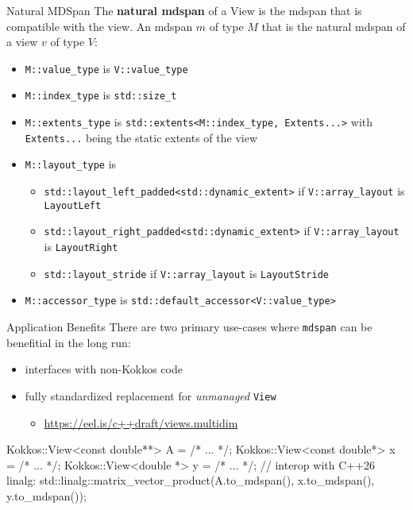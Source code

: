 \begin{frame}[fragile]{Natural MDSpan}
The \textbf{natural mdspan} of a View is the mdspan that is compatible with the view. An mdspan $m$ of type $M$ that is the natural mdspan of a view $v$ of type $V$:
\begin{itemize}
  \item \texttt{M::value\_type} is \texttt{V::value\_type}
  \item \texttt{M::index\_type} is \texttt{std::size\_t}
  \item \texttt{M::extents\_type} is \texttt{std::extents<M::index\_type, Extents...>} with \texttt{Extents...} being the static extents of the view
  \item \texttt{M::layout\_type} is
  \begin{itemize}
    \item \texttt{std::layout\_left\_padded<std::dynamic\_extent>} if \texttt{V::array\_layout} is \texttt{LayoutLeft}
    \item \texttt{std::layout\_right\_padded<std::dynamic\_extent>} if \texttt{V::array\_layout} is \texttt{LayoutRight}
    \item \texttt{std::layout\_stride} if \texttt{V::array\_layout} is \texttt{LayoutStride}
  \end{itemize}
  \item \texttt{M::accessor\_type} is \texttt{std::default\_accessor<V::value\_type>}
\end{itemize}

\end{frame}

\begin{frame}[fragile]{Application Benefits}
There are two primary use-cases where \texttt{mdspan} can be benefitial in the long run:
\begin{itemize}
   \item interfaces with non-Kokkos code
   \item fully standardized replacement for \textit{unmanaged} \texttt{View}
   \begin{itemize}
     \item \url{https://eel.is/c++draft/views.multidim}
   \end{itemize}
\end{itemize}

\begin{code}
  Kokkos::View<const double**> A = /* ... */;
  Kokkos::View<const double*> x = /* ... */;
  Kokkos::View<double *> y = /* ... */;
  // interop with C++26 linalg:
  std::linalg::matrix_vector_product(A.to_mdspan(), x.to_mdspan(), y.to_mdspan());
\end{code}
\end{frame}

